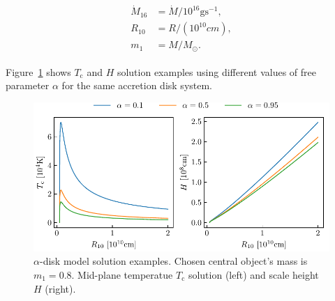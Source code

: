     \begin{align}
    \begin{split}
        \dot{M}_{16} &= \dot{M} / 10^{16} \si{\gram \second^{-1}}, \\
        R_{10} &= R / (10^{10} \si{cm}), \\
        m_1 &= M / M_{\odot}.
    \end{split} 
    \end{align}

    Figure~\ref{fig:plot_alpha_H_T} shows $T_{\mathrm{c}}$ and $H$ solution examples using different values of free parameter $\alpha$ for the same accretion disk system.

    \begin{figure}[H]
        \centering
        \includegraphics[scale=1.0]{img/plot_alpha_H_T.pdf}
        \caption{$\alpha$-disk model solution examples. Chosen central object's mass is $m_1 = 0.8$. Mid-plane temperatue $T_{\mathrm{c}}$ solution (left) and scale height $H$ (right).}
        \label{fig:plot_alpha_H_T}
    \end{figure}
